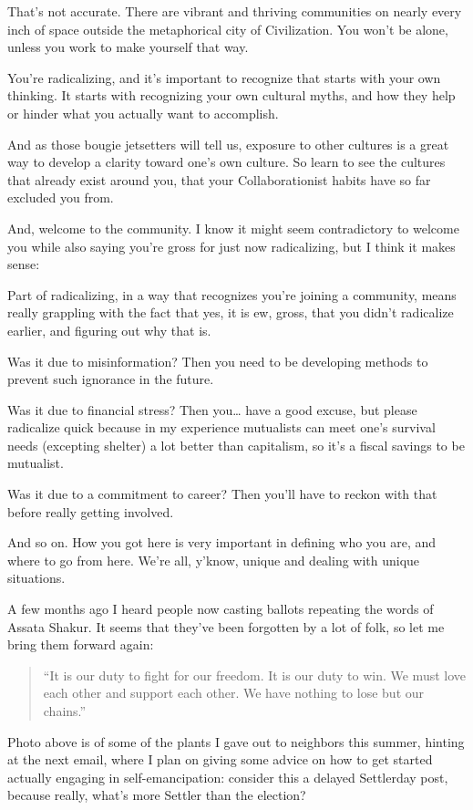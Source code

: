 \documentclass[11pt]{article}
\begin{document}
\begin{itemize}
That's not accurate. There are vibrant and thriving communities on nearly every inch of space outside the metaphorical city of Civilization. You won't be alone, unless you work to make yourself that way.

You're radicalizing, and it's important to recognize that starts with your own thinking. It starts with recognizing your own cultural myths, and how they help or hinder what you actually want to accomplish.

And as those bougie jetsetters will tell us, exposure to other cultures is a great way to develop a clarity toward one's own culture. So learn to see the cultures that already exist around you, that your Collaborationist habits have so far excluded you from.

And, welcome to the community. I know it might seem contradictory to welcome you while also saying you’re gross for just now radicalizing, but I think it makes sense:

Part of radicalizing, in a way that recognizes you're joining a community, means really grappling with the fact that yes, it is ew, gross, that you didn't radicalize earlier, and figuring out why that is.

Was it due to misinformation? Then you need to be developing methods to prevent such ignorance in the future.

Was it due to financial stress? Then you\ldots{} have a good excuse, but please radicalize quick because in my experience mutualists can meet one's survival needs (excepting shelter) a lot better than capitalism, so it's a fiscal savings to be mutualist.

Was it due to a commitment to career? Then you'll have to reckon with that before really getting involved.

And so on. How you got here is very important in defining who you are, and where to go from here. We're all, y'know, unique and dealing with unique situations.

A few months ago I heard people now casting ballots repeating the words of Assata Shakur. It seems that they’ve been forgotten by a lot of folk, so let me bring them forward again:

\begin{quote}
“It is our duty to fight for our freedom. It is our duty to win. We must love each other and support each other. We have nothing to lose but our chains.”
\end{quote}

Photo above is of some of the plants I gave out to neighbors this summer, hinting at the next email, where I plan on giving some advice on how to get started actually engaging in self-emancipation: consider this a delayed Settlerday post, because really, what’s more Settler than the election?
\end{itemize}
\end{document}
